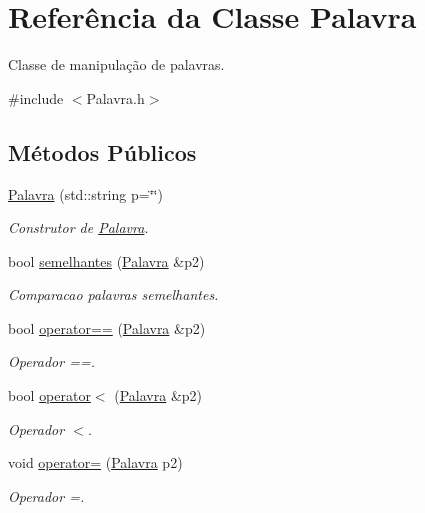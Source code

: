 \hypertarget{classPalavra}{}\section{Referência da Classe Palavra}
\label{classPalavra}


Classe de manipulação de palavras.  




{\ttfamily \#include $<$Palavra.\+h$>$}

\subsection*{Métodos Públicos}
\begin{DoxyCompactItemize}
\item 
\hyperlink{classPalavra_a81db9f79dee404bfd73fe9fc9f861be3}{Palavra} (std\+::string p=\char`\"{}\char`\"{})
\begin{DoxyCompactList}\small\item\em Construtor de \hyperlink{classPalavra}{Palavra}. \end{DoxyCompactList}\item 
bool \hyperlink{classPalavra_ae3c7cea7ef6603efb3899adc34dba9d8}{semelhantes} (\hyperlink{classPalavra}{Palavra} \&p2)
\begin{DoxyCompactList}\small\item\em Comparacao palavras semelhantes. \end{DoxyCompactList}\item 
bool \hyperlink{classPalavra_a0db696a5fd0261a07d35d367a114afa7}{operator==} (\hyperlink{classPalavra}{Palavra} \&p2)
\begin{DoxyCompactList}\small\item\em Operador ==. \end{DoxyCompactList}\item 
bool \hyperlink{classPalavra_a2b9f86de9d71ca9f35f63c5644ec2891}{operator$<$} (\hyperlink{classPalavra}{Palavra} \&p2)
\begin{DoxyCompactList}\small\item\em Operador $<$. \end{DoxyCompactList}\item 
void \hyperlink{classPalavra_a0cd3f5e0a73d58968554e1843bed52ea}{operator=} (\hyperlink{classPalavra}{Palavra} p2)
\begin{DoxyCompactList}\small\item\em Operador =. \end{DoxyCompactList}\item 

\end{DoxyCompactItemize}
